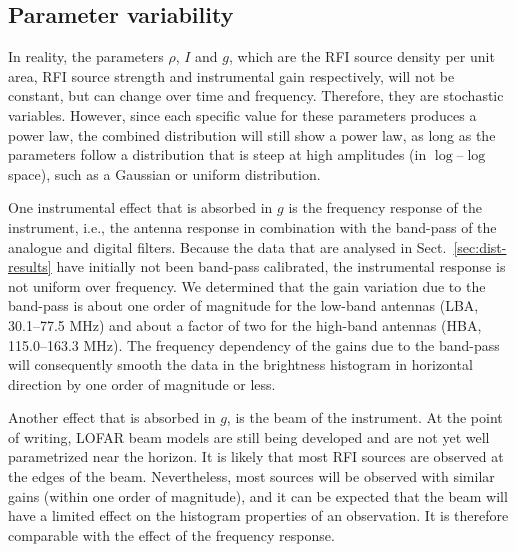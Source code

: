 \documentclass[useAMS,usenatbib]{mn2e}
\begin{document}
\subsection{Parameter variability} \label{sec:parameter-variability}
In reality, the parameters $\rho$, $I$ and $g$, which are the RFI source density per unit area, RFI source strength and instrumental gain respectively, will not be constant, but can change over time and frequency. Therefore, they are stochastic variables. However, since each specific value for these parameters produces a power law, the combined distribution will still show a power law, as long as the parameters follow a distribution that is steep at high amplitudes (in $\log$--$\log$ space), such as a Gaussian or uniform distribution.

One instrumental effect that is absorbed in $g$ is the frequency response of the instrument, i.e., the antenna response in combination with the band-pass of the analogue and digital filters. Because the data that are analysed in Sect.~\ref{sec:dist-results} have initially not been band-pass calibrated, the instrumental response is not uniform over frequency. We determined that the gain variation due to the band-pass is about one order of magnitude for the low-band antennas (LBA, 30.1--77.5 MHz) and about a factor of two for the high-band antennas (HBA, 115.0--163.3 MHz). The frequency dependency of the gains due to the band-pass will consequently smooth the data in the brightness histogram in horizontal direction by one order of magnitude or less.

Another effect that is absorbed in $g$, is the beam of the instrument. At the point of writing, LOFAR beam models are still being developed and are not yet well parametrized near the horizon. It is likely that most RFI sources are observed at the edges of the beam. Nevertheless, most sources will be observed with similar gains (within one order of magnitude), and it can be expected that the beam will have a limited effect on the histogram properties of an observation. It is therefore comparable with the effect of the frequency response.
\end{document}
